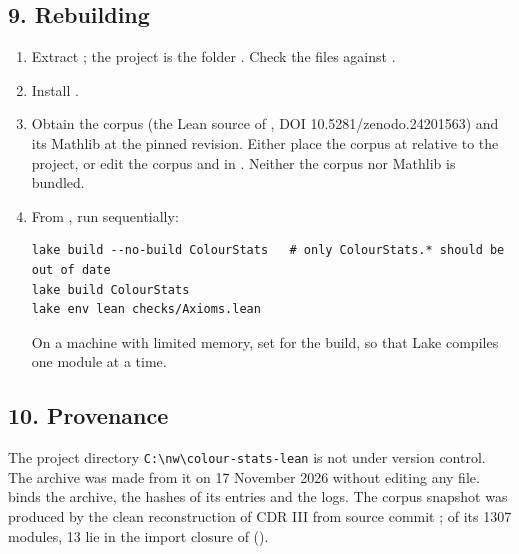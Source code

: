 \documentclass[english,11pt,a4paper]{article}
\begin{document}
\subsection{9. Rebuilding}\label{rebuilding}

\begin{enumerate}
\def\labelenumi{\arabic{enumi}.}
\item
  Extract ; the project is the folder . Check the files against .
\item
  Install .
\item
  Obtain the corpus (the Lean source of , DOI 10.5281/zenodo.24201563) and its Mathlib at the pinned revision. Either place the corpus at  relative to the project, or edit the corpus  and  in . Neither the corpus nor Mathlib is bundled.
\item
  From , run sequentially:

\begin{verbatim}
lake build --no-build ColourStats   # only ColourStats.* should be out of date
lake build ColourStats
lake env lean checks/Axioms.lean
\end{verbatim}

  On a machine with limited memory, set  for the build, so that Lake compiles one module at a time.
\end{enumerate}

\subsection{10. Provenance}\label{provenance}

The project directory \texttt{C:\textbackslash{}nw\textbackslash{}colour-stats-lean} is not under version control. The archive was made from it on 17 November 2026 without editing any file.  binds the archive, the hashes of its entries and the logs. The corpus snapshot was produced by the clean reconstruction of CDR III from source commit ; of its 1307 modules, 13 lie in the import closure of  ().
\end{document}
